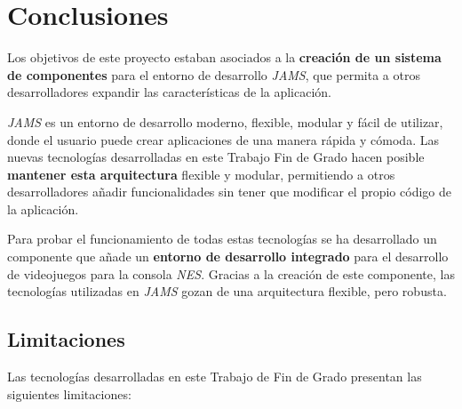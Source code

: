 \chapter{Conclusiones}\label{ch:conclusiones}

Los objetivos de este proyecto estaban asociados
a la \textbf{creación de un sistema de componentes}
para el entorno de desarrollo \textit{JAMS}, que permita
a otros desarrolladores expandir las características
de la aplicación.

\textit{JAMS} es un entorno de desarrollo moderno,
flexible, modular y fácil de utilizar, donde el usuario
puede crear aplicaciones de una manera rápida y cómoda.
Las nuevas tecnologías desarrolladas en este
Trabajo Fin de Grado hacen posible \textbf{mantener esta arquitectura}
flexible y modular, permitiendo a otros desarrolladores
añadir funcionalidades sin tener que modificar el propio
código de la aplicación.

Para probar el funcionamiento de todas estas tecnologías
se ha desarrollado un componente que añade un \textbf{entorno
de desarrollo integrado} para el desarrollo de videojuegos
para la consola \textit{NES}.
Gracias a la creación de este componente, las tecnologías
utilizadas en \textit{JAMS} gozan de una arquitectura
flexible, pero robusta.

\section{Limitaciones}\label{sec:limitaciones}

Las tecnologías desarrolladas en este Trabajo
de Fin de Grado presentan las siguientes limitaciones:

